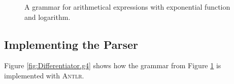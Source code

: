 \begin{figure}[htbp]
  \begin{center}    
  \end{center}
  \caption{A grammar for arithmetical expressions with exponential function and logarithm.}
  \label{fig:Expr-exp-ln}
\end{figure}

\subsection{Implementing the Parser}
Figure \ref{fig:Differentiator.g4} shows how the grammar from Figure \ref{fig:Expr-exp-ln} is implemented with \textsc{Antlr}.  

